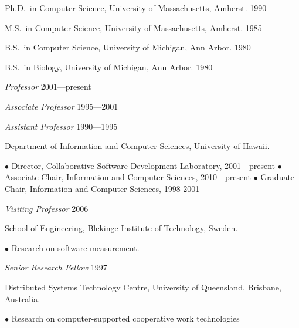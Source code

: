 \begin{Degrees} 
\item Ph.D.~in Computer Science, University of Massachusetts, Amherst. 1990
\item M.S.~in Computer Science, University of Massachusetts, Amherst. 1985 
\item B.S.~in Computer Science,  University of Michigan, Ann Arbor. 1980 
\item B.S.~in Biology, University of Michigan, Ann Arbor. 1980  
\end{Degrees}

\begin{Research and Teaching Experience}
  
\item {\em Professor} \hfill 2001---present 
\vspace*{-10pt}
\item {\em Associate Professor} \hfill 1995---2001
\vspace*{-10pt}
\item {\em Assistant Professor} \hfill  1990---1995
\vspace*{-10pt}
\item Department of Information and Computer Sciences, University of Hawaii.  
  
 $\bullet$  Director, Collaborative Software Development Laboratory, 2001 - present \newline
 $\bullet$  Associate Chair, Information and Computer Sciences, 2010 - present \newline
 $\bullet$  Graduate Chair, Information and Computer Sciences, 1998-2001 \newline

\item {\em Visiting Professor} \hfill   2006
\vspace*{-10pt}
\item School of Engineering, Blekinge Institute of Technology, Sweden.

 $\bullet$  Research on software measurement. \newline

\item {\em Senior Research Fellow} \hfill   1997
\vspace*{-10pt}
\item Distributed Systems Technology Centre, University of Queensland, 
Brisbane, Australia.

 $\bullet$  Research on computer-supported cooperative work technologies \newline


\end{Research and Teaching Experience}
